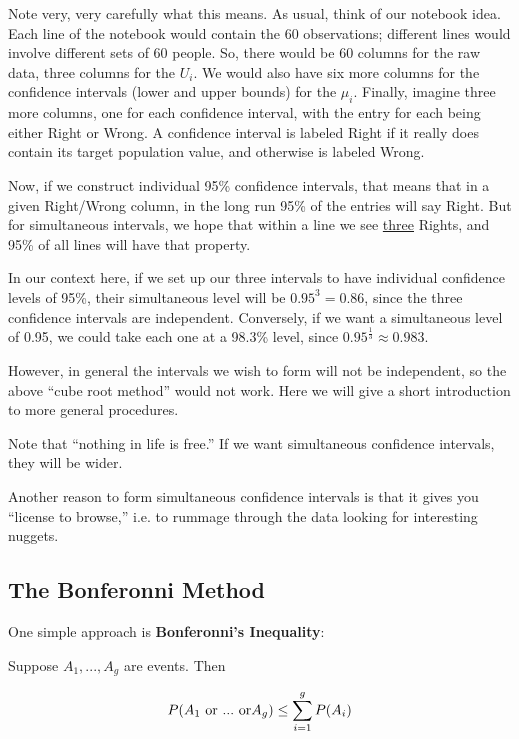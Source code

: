 Note very, very carefully what this means.  As usual, think of our
notebook idea.  Each line of the notebook would contain the 60
observations; different lines would involve different sets of 60 people.
So, there would be 60 columns for the raw data, three columns for the
$U_i$.  We would also have six more columns for the confidence intervals
(lower and upper bounds) for the $\mu_i$.  Finally, imagine three more
columns, one for each confidence interval, with the entry for each being
either Right or Wrong.  A confidence interval is labeled Right if it
really does contain its target population value, and otherwise is
labeled Wrong.

Now, if we construct individual 95\% confidence intervals, that means
that in a given Right/Wrong column, in the long run 95\% of the entries
will say Right.  But for simultaneous intervals, we hope that within a
line we see \underline{three} Rights, and 95\% of all lines will have
that property.

In our context here, if we set up our three intervals to have individual
confidence levels of 95\%, their simultaneous level will be $0.95^3 =
0.86$, since the three confidence intervals are independent.
Conversely, if we want a simultaneous level of 0.95, we could take each
one at a 98.3\% level, since $0.95^{\frac{1}{3}} \approx 0.983$.

However, in general the intervals we wish to form will not be
independent, so the above ``cube root method'' would not work.  Here we
will give a short introduction to more general procedures.

Note that ``nothing in life is free.''  If we want simultaneous
confidence intervals, they will be wider.

Another reason to form simultaneous confidence intervals is that it
gives you  ``license to browse,'' i.e. to rummage through the data
looking for interesting nuggets.

\subsection{The Bonferonni Method}

One simple approach is {\bf Bonferonni's Inequality}:

\begin{lemma}
Suppose $A_1,...,A_g$ are events.  Then

\begin{equation}
\label{bonf}
P(A_1 {\rm ~or~...~or} A_g) \leq \sum_{i=1}^{g} P(A_i)
\end{equation}

\end{lemma}

